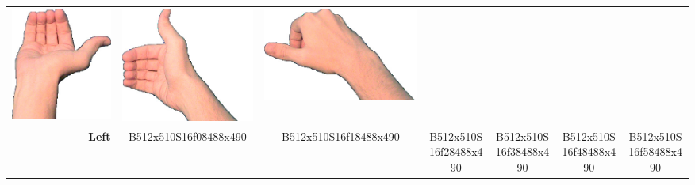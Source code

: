 \documentclass{article}
\begin{document}
\begin{center}
\begin{tabular}{r*{6}{c}}
\includegraphics[scale=0.1]{images/05-15-4.jpg}&
\includegraphics[scale=0.1]{images/05-15-5.jpg}&
\includegraphics[scale=0.1]{images/05-15-6.jpg}\\
\textbf{Left}&
B512x510S16f08488x490&
B512x510S16f18488x490&
B512x510S16f28488x490&
B512x510S16f38488x490&
B512x510S16f48488x490&
B512x510S16f58488x490\\
\end{tabular}
\end{center}
\end{document}
